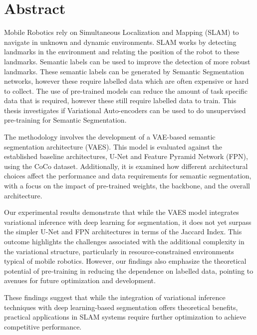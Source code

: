\chapter*{Abstract}\label{chapter:abstract}

Mobile Robotics rely on Simultaneous Localization and Mapping (SLAM) to navigate in unknown and dynamic environments. SLAM works by detecting landmarks in the environment and relating the position of the robot to these landmarks. Semantic labels can be used to improve the detection of more robust landmarks. These semantic labels can be generated by Semantic Segmentation networks, however these require labelled data which are often expensive or hard to collect. The use of pre-trained models can reduce the amount of task specific data that is required, however these still require labelled data to train. This thesis investigates if Variational Auto-encoders can be used to do unsupervised pre-training for Semantic Segmentation.

The methodology involves the development of a VAE-based semantic segmentation architecture (VAES). This model is evaluated against the established baseline architectures, U-Net and Feature Pyramid Network (FPN), using the CoCo dataset. Additionally, it is examined how different architectural choices affect the performance and data requirements for semantic segmentation, with a focus on the impact of pre-trained weights, the backbone, and the overall architecture.

Our experimental results demonstrate that while the VAES model integrates variational inference with deep learning for segmentation, it does not yet surpass the simpler U-Net and FPN architectures in terms of the Jaccard Index. This outcome highlights the challenges associated with the additional complexity in the variational structure, particularly in resource-constrained environments typical of mobile robotics. However, our findings also emphasize the theoretical potential of pre-training in reducing the dependence on labelled data, pointing to avenues for future optimization and development.

These findings suggest that while the integration of variational inference techniques with deep learning-based segmentation offers theoretical benefits, practical applications in SLAM systems require further optimization to achieve competitive performance. 
